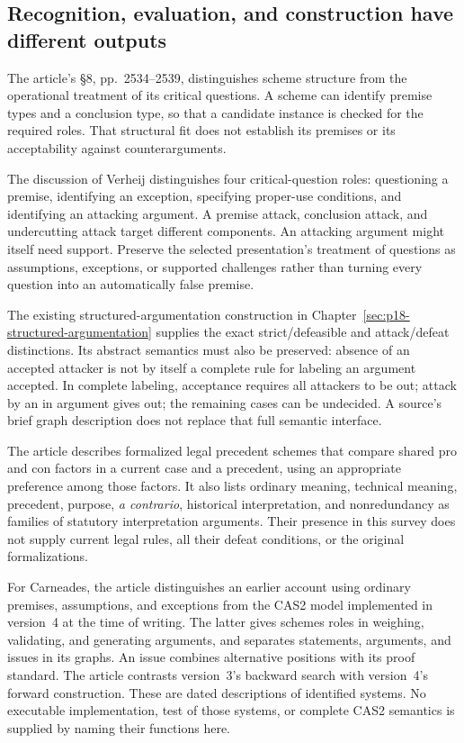 \subsection{Recognition, evaluation, and construction have different outputs}

The article's \S8, pp.~2534--2539, distinguishes scheme structure
from the operational treatment of its critical questions.
A scheme can identify premise types and a conclusion type, so that
a candidate instance is checked for the required roles.
That structural fit does not establish its premises or its
acceptability against counterarguments.

The discussion of Verheij distinguishes four critical-question roles:
questioning a premise, identifying an exception, specifying proper-use
conditions, and identifying an attacking argument.
A premise attack, conclusion attack, and undercutting attack target
different components. An attacking argument might itself need
support. Preserve the selected presentation's treatment of questions
as assumptions, exceptions, or supported challenges rather than
turning every question into an automatically false premise.

The existing structured-argumentation construction in
Chapter~\ref{sec:p18-structured-argumentation}
supplies the exact strict/defeasible and attack/defeat distinctions.
Its abstract semantics must also be preserved: absence of an
accepted attacker is not by itself a complete rule for labeling an
argument accepted. In complete labeling, acceptance requires all
attackers to be out; attack by an in argument gives out; the remaining
cases can be undecided. A source's brief graph description does
not replace that full semantic interface.

The article describes formalized legal precedent schemes that
compare shared pro and con factors in a current case and a precedent,
using an appropriate preference among those factors. It also lists
ordinary meaning, technical meaning, precedent, purpose,
\emph{a contrario}, historical interpretation, and nonredundancy as
families of statutory interpretation arguments.
Their presence in this survey does not supply current legal rules,
all their defeat conditions, or the original formalizations.

For Carneades, the article distinguishes an earlier account using
ordinary premises, assumptions, and exceptions from the CAS2 model
implemented in version~4 at the time of writing.
The latter gives schemes roles in weighing, validating, and
generating arguments, and separates statements, arguments, and
issues in its graphs. An issue combines alternative positions
with its proof standard. The article contrasts version~3's backward
search with version~4's forward construction.
These are dated descriptions of identified systems.
No executable implementation, test of those systems, or complete
CAS2 semantics is supplied by naming their functions here.

